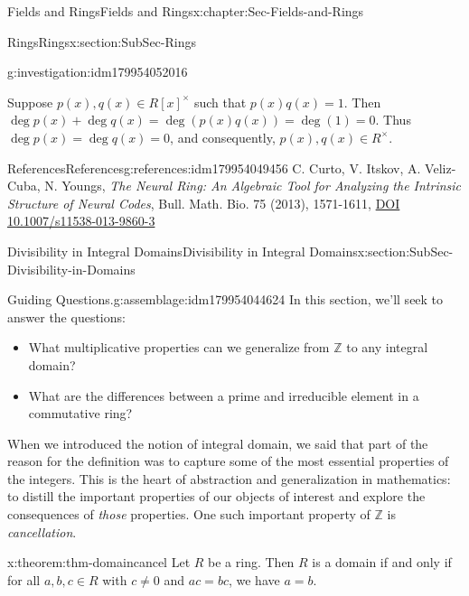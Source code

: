\documentclass[oneside,10pt,]{book}
\numberwithin{equation}{section}
\def\Z{{\mathbb Z}}
\begin{document}
\begin{chapterptx}{Fields and Rings}{}{Fields and Rings}{}{}{x:chapter:Sec-Fields-and-Rings}
\begin{sectionptx}{Rings}{}{Rings}{}{}{x:section:SubSec-Rings}
\begin{investigation}{}{g:investigation:idm179954052016}
\par
Suppose \(p(x),q(x)\in R[x]^\times\) such that \(p(x) q(x) = 1\). Then \(\deg p(x) + \deg q(x) = \deg(p(x) q(x)) = \deg(1) = 0\). Thus \(\deg p(x) = \deg q(x) = 0\), and consequently, \(p(x),q(x)\in R^\times\).%
\end{investigation}
%
%
\typeout{************************************************}
\typeout{************************************************}
%
\begin{references-subsection-numberless}{References}{}{References}{}{}{g:references:idm179954049456}
C. Curto, V. Itskov, A. Veliz-Cuba, N. Youngs, \emph{The Neural Ring: An Algebraic Tool for Analyzing the Intrinsic Structure of Neural Codes}, Bull. Math. Bio. 75 (2013), 1571-1611, \href{https://doi.org/10.1007/s11538-013-9860-3}{DOI 10.1007\slash{}s11538-013-9860-3}\end{references-subsection-numberless}
\end{sectionptx}
%
%
\typeout{************************************************}
\typeout{************************************************}
%
\begin{sectionptx}{Divisibility in Integral Domains}{}{Divisibility in Integral Domains}{}{}{x:section:SubSec-Divisibility-in-Domains}
\begin{assemblage}{Guiding Questions.}{g:assemblage:idm179954044624}%
In this section, we'll seek to answer the questions: %
\begin{itemize}[label=\textbullet]
\item{}What multiplicative properties can we generalize from \(\Z\) to any integral domain?%
\item{}What are the differences between a prime and irreducible element in a commutative ring?%
\end{itemize}
%
\end{assemblage}
When we introduced the notion of integral domain, we said that part of the reason for the definition was to capture some of the most essential properties of the integers. This is the heart of abstraction and generalization in mathematics: to distill the important properties of our objects of interest and explore the consequences of \emph{those} properties. One such important property of \(\Z\) is \emph{cancellation}.%
\begin{theorem}{}{}{x:theorem:thm-domaincancel}%
Let \(R\) be a ring. Then \(R\) is a domain if and only if for all \(a,b,c\in R\) with \(c\ne 0\) and \(ac = bc\), we have \(a = b\).%

\end{theorem}
\end{sectionptx}
\end{chapterptx}
\end{document}
